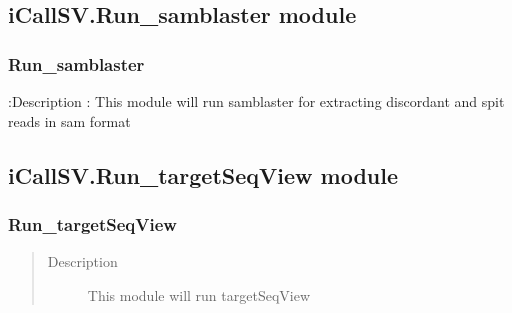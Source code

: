 \documentclass[letterpaper,10pt,english]{sphinxmanual}
\begin{document}
\subsection{iCallSV.Run\_samblaster module}
\label{iCallSV:icallsv-run-samblaster-module}\label{iCallSV:module-iCallSV.Run_samblaster}

\subsubsection{Run\_samblaster}
\label{iCallSV:run-samblaster}
:Description : This module will run samblaster for extracting discordant and spit reads in sam format

\begin{fulllineitems}
\label{iCallSV:iCallSV.Run_samblaster.run}
\end{fulllineitems}



\subsection{iCallSV.Run\_targetSeqView module}
\label{iCallSV:module-iCallSV.Run_targetSeqView}\label{iCallSV:icallsv-run-targetseqview-module}

\subsubsection{Run\_targetSeqView}
\label{iCallSV:run-targetseqview}\begin{quote}\begin{description}
\item[{Description}] \leavevmode
This module will run targetSeqView

\end{description}\end{quote}
\end{document}
